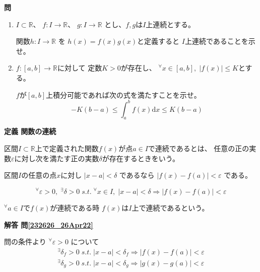 \documentclass[12pt,b5paper]{ltjsarticle}
\begin{document}
\textbf{問}

\begin{enumerate}
 \item $I \subset \mathbb{R}$、
       $f: I \rightarrow \mathbb{R}$、
       $g: I \rightarrow \mathbb{R}$
       とし、$f,g$は$I$上連続とする。

       関数$h: I \rightarrow \mathbb{R}$ を
       $h(x)= f(x)g(x)$と定義すると
       $I$上連続であることを示せ。
       \label{232626_26Apr22}
 \item $f: [a,b] \rightarrow \mathbb{R}$に対して
       定数$K>0$が存在し、
       ${}^\forall x\in [a,b], \; \lvert f(x) \rvert \leq K$とする。

       $f$が$[a,b]$上積分可能であれば次の式を満たすことを示せ。
       \label{020549_27Apr22}
       \begin{equation}
        -K(b-a) \leq \int_a^b f(x)\mathrm{d}x \leq K(b-a)
       \end{equation}
\end{enumerate}

\hrulefill

\textbf{定義 関数の連続}

区間$I\subset \mathbb{R}$上で定義された関数$f(x)$が点$a\in I$で連続であるとは、
任意の正の実数$\varepsilon$に対し次を満たす正の実数$\delta$が存在するときをいう。

区間$I$の任意の点$x$に対し $\lvert x-a \rvert < \delta$ であるなら
$\lvert f(x)-f(a) \rvert < \varepsilon$ である。

\begin{equation}
 {}^\forall \varepsilon >0 , \; {}^\exists \delta > 0 \;
  s.t. \;
  {}^\forall x \in I ,  \; \lvert x-a \rvert  < \delta \Rightarrow \lvert f(x)-f(a) \rvert < \varepsilon
\end{equation}

${}^\forall a \in I$で$f(x)$が連続である時
$f(x)$は$I$上で連続であるという。

\dotfill

\textbf{解答 問\ref{232626_26Apr22}}

問の条件より
${}^\forall \varepsilon >0$
について
\begin{align}
 {}^\exists \delta_f > 0 \;  s.t. \;
  \lvert x-a \rvert  < \delta_f \Rightarrow \lvert f(x)-f(a) \rvert < \varepsilon\label{014259_27Apr22}\\
 {}^\exists \delta_g > 0 \;  s.t. \;
  \lvert x-a \rvert  < \delta_g \Rightarrow \lvert g(x)-g(a) \rvert < \varepsilon\label{014313_27Apr22}
\end{align}
\end{document}
